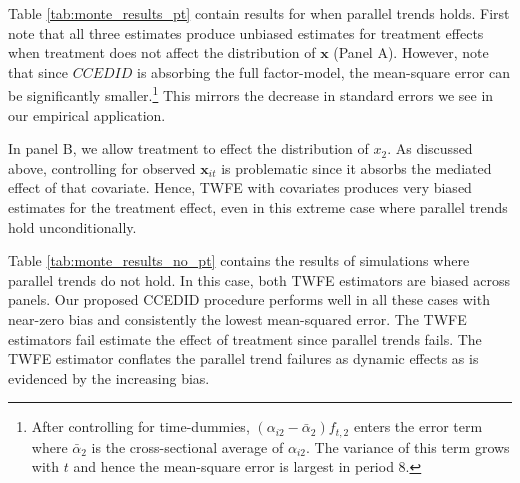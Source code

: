 \documentclass[12pt,fleqn]{article}
\def\*#1{\mathbf{#1}}
\begin{document}
Table \ref{tab:monte_results_pt} contain results for when parallel trends holds. First note that all three estimates produce unbiased estimates for treatment effects when treatment does not affect the distribution of $\*x$ (Panel A). However, note that since $CCEDID$ is absorbing the full factor-model, the mean-square error can be significantly smaller.\footnote{After controlling for time-dummies, $(\alpha_{i2} - \bar{\alpha}_{2}) f_{t,2}$ enters the error term where $\bar{\alpha}_2$ is the cross-sectional average of $\alpha_{i2}$. The variance of this term grows with $t$ and hence the mean-square error is largest in period 8.} This mirrors the decrease in standard errors we see in our empirical application. 

In panel B, we allow treatment to effect the distribution of $x_2$. As discussed above, controlling for observed $\bm x_{it}$ is problematic since it absorbs the mediated effect of that covariate. Hence, TWFE with covariates produces very biased estimates for the treatment effect, even in this extreme case where parallel trends hold unconditionally. 

Table \ref{tab:monte_results_no_pt} contains the results of simulations where parallel trends do not hold. In this case, both TWFE estimators are biased across panels. Our proposed CCEDID procedure performs well in all these cases with near-zero bias and consistently the lowest mean-squared error. The TWFE estimators fail estimate the effect of treatment since parallel trends fails. The TWFE estimator conflates the parallel trend failures as dynamic effects as is evidenced by the increasing bias.
\end{document}
